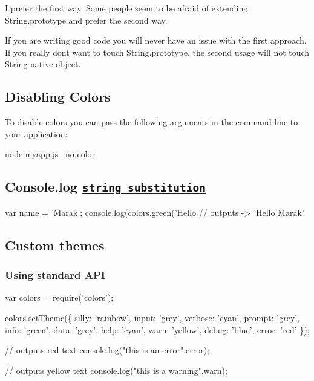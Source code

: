 I prefer the first way. Some people seem to be afraid of extending {\ttfamily String.\+prototype} and prefer the second way.

If you are writing good code you will never have an issue with the first approach. If you really don\textquotesingle{}t want to touch {\ttfamily String.\+prototype}, the second usage will not touch {\ttfamily String} native object.

\subsection*{Disabling Colors}

To disable colors you can pass the following arguments in the command line to your application\+:


\begin{DoxyCode}
node myapp.js --no-color
\end{DoxyCode}


\subsection*{Console.\+log \href{http://nodejs.org/docs/latest/api/console.html#console_console_log_data}{\tt string substitution}}


\begin{DoxyCode}
var name = 'Marak';
console.log(colors.green('Hello %
// outputs -> 'Hello Marak'
\end{DoxyCode}


\subsection*{Custom themes}

\subsubsection*{Using standard A\+PI}


\begin{DoxyCode}
var colors = require('colors');

colors.setTheme(\{
  silly: 'rainbow',
  input: 'grey',
  verbose: 'cyan',
  prompt: 'grey',
  info: 'green',
  data: 'grey',
  help: 'cyan',
  warn: 'yellow',
  debug: 'blue',
  error: 'red'
\});

// outputs red text
console.log("this is an error".error);

// outputs yellow text
console.log("this is a warning".warn);
\end{DoxyCode}


